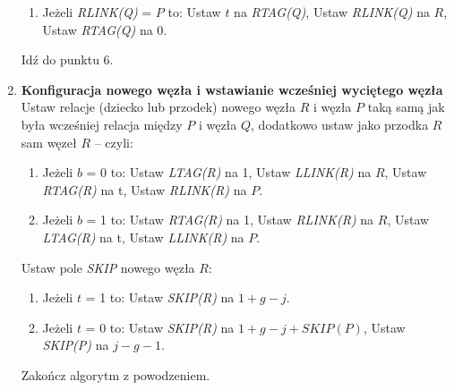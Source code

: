 \begin{enumerate}
\begin{enumerate}
			\item Jeżeli \emph{RLINK(Q)} = $P$ to: \newline
			Ustaw $t$ na \emph{RTAG(Q)}, \newline
			Ustaw \emph{RLINK(Q)} na $R$, \newline
			Ustaw \emph{RTAG(Q)} na $0$.
		\end{enumerate}
		Idź do punktu 6.
		
		\item \textbf{Konfiguracja nowego węzła i wstawianie wcześniej wyciętego węzła} \newline
		Ustaw relacje (dziecko lub przodek) nowego węzła $R$ i węzła $P$ taką samą jak była wcześniej relacja między $P$ i węzła $Q$, dodatkowo ustaw jako przodka $R$ sam węzeł $R$ -- czyli:
		\begin{enumerate}
			\item Jeżeli $b$ = 0 to: \newline
			Ustaw \emph{LTAG(R)} na 1, \newline
			Ustaw \emph{LLINK(R)} na $R$, \newline
			Ustaw \emph{RTAG(R)} na t, \newline
			Ustaw \emph{RLINK(R)} na $P$.
			
			\item Jeżeli $b$ = 1 to: \newline
			Ustaw \emph{RTAG(R)} na 1, \newline
			Ustaw \emph{RLINK(R)} na $R$, \newline
			Ustaw \emph{LTAG(R)} na t, \newline
			Ustaw \emph{LLINK(R)} na $P$.
		\end{enumerate}
		
		Ustaw pole \emph{SKIP} nowego węzła $R$: 
		\begin{enumerate}
			\item Jeżeli $t$ = 1 to: \newline
			Ustaw \emph{SKIP(R)} na $1 + g - j$.
			
			\item Jeżeli $t$ = 0 to: \newline
			Ustaw \emph{SKIP(R)} na $1 + g - j + SKIP(P)$, \newline
			Ustaw \emph{SKIP(P)} na $j - g - 1$.
		\end{enumerate}
		Zakończ algorytm z powodzeniem.
		
	\end{enumerate}
	

